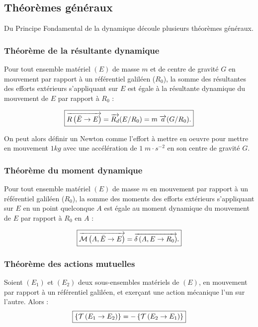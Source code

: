 \documentclass[10pt,fleqn]{article} %
\begin{document}
\subsection{Théorèmes généraux}

Du Principe Fondamental de la dynamique découle plusieurs théorèmes généraux.
\subsubsection{Théorème de la résultante dynamique}

		\begin{theorem}
			Pour tout ensemble matériel $(E)$ de masse $m$ et de centre de gravité $G$ en mouvement par rapport à un référentiel galiléen ($R_0$), la somme des résultantes des efforts extérieurs s'appliquant sur $E$ est égale à la résultante dynamique du mouvement de $E$ par rapport à $R_0$ :
			
			\begin{align}
			\boxed{
				\overrightarrow{R\left( {\bar E} \rightarrow {E}\right)}=\overrightarrow{R_d}(E/R_0)=m\;\overrightarrow{a}(G/R_0).
			}			
			\end{align}
		\end{theorem}


\begin{rem}
On peut alors définir un Newton comme l'effort à mettre en oeuvre pour mettre en mouvement $1kg$ avec une accélération de $1\;m\cdot s^{-2}$ en son centre de gravité $G$.
\end{rem}
\subsubsection{Théorème du moment dynamique}
\begin{theorem}
			Pour tout ensemble matériel $(E)$ de masse $m$ en mouvement par rapport à un référentiel galiléen ($R_0$), la somme des moments des efforts extérieurs s'appliquant sur $E$ en un point quelconque $A$ est égale au moment dynamique du mouvement de $E$ par rapport à $R_0$ en $A$ :
			
			\begin{align}
			\boxed{
				\overrightarrow{\mathcal{M}\left( {A}, {\bar E} \rightarrow {E}\right)}=\overrightarrow{\delta \left( {A}, {E} \rightarrow {R_0}\right)}.
			}			
			\end{align}
		\end{theorem}

\subsubsection{Théorème des actions mutuelles}
\begin{theorem}
			Soient $(E_1)$ et $(E_2)$ deux sous-ensembles matériels de $(E)$,
			en mouvement par rapport à un référentiel galiléen, et exerçant une action mécanique l'un sur l'autre.
			Alors :
			\begin{align}
			\boxed{
				\left\{\mathcal{T} \left(E_1\rightarrow E_2 \right) \right\}=-\left\{\mathcal{T} \left(E_2\rightarrow E_1 \right) \right\}
				}
			\end{align}
		\end{theorem}
		
\end{document}
